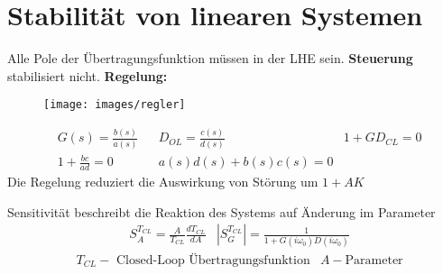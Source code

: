 \setcounter{section}{5}
\section{Stabilität von linearen Systemen}
\begin{tcolorbox}[colback=white!10!white,colframe=green!30!black,title=Stabilität] 
Alle Pole der Übertragungsfunktion müssen in der LHE sein. \textbf{Steuerung} stabilisiert nicht. 
\textbf{Regelung:}

    \begin{figure}[H]
        \centering
        \texttt{[image: images/regler]}
\end{figure}
    \begin{align*}
    &G(s) = \frac{b(s)}{a(s)}  && D_{OL} = \frac{c(s)}{d(s)}
    &1+ G D_{CL} = 0\\ 
    &1 + \frac{bc}{ad} = 0  &&
    a(s)d(s) + b(s)c(s) = 0 
    \end{align*}
Die Regelung reduziert die Auswirkung von Störung um $1+ AK$
\end{tcolorbox}



\begin{tcolorbox}[colback=white!10!white,colframe=green!30!black,title=Sensitivität] 
    Sensitivität beschreibt die Reaktion des Systems auf Änderung im Parameter
    \begin{align*}
        & S_{A}^{T_{CL}} = \frac{A}{T_{CL}}\frac{d T_{CL}}{dA}
        & |S_{G}^{T_{CL}}| = \frac{1}{1+G(i\omega_0)D(i\omega_0)}
        \end{align*}
    \begin{align*}
        &T_{CL} -\text{ Closed-Loop Übertragungsfunktion} & A - \text{Parameter}
    \end{align*}
\end{tcolorbox}

